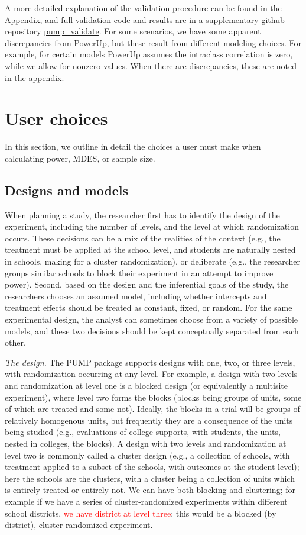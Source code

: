 \documentclass[
]{article}
\begin{document}
A more detailed explanation of the validation procedure can be found in
the Appendix, and full validation code and results are in a
supplementary github repository
\href{https://github.com/MDRCNY/pump_validate}{pump\_validate}. For some
scenarios, we have some apparent discrepancies from PowerUp, but these
result from different modeling choices. For example, for certain models
PowerUp assumes the intraclass correlation is zero, while we allow for
nonzero values. When there are discrepancies, these are noted in the
appendix.

\section{User choices}

In this section, we outline in detail the choices a user must make when
calculating power, MDES, or sample size.

\subsection{Designs and models}
\label{sec:d_m}

When planning a study, the researcher first has to identify the design
of the experiment, including the number of levels, and the level at
which randomization occurs. These decisions can be a mix of the
realities of the context (e.g., the treatment must be applied at the
school level, and students are naturally nested in schools, making for a
cluster randomization), or deliberate (e.g., the researcher groups
similar schools to block their experiment in an attempt to improve
power). Second, based on the design and the inferential goals of the
study, the researchers chooses an assumed model, including whether
intercepts and treatment effects should be treated as constant, fixed,
or random. For the same experimental design, the analyst can sometimes
choose from a variety of possible models, and these two decisions should
be kept conceptually separated from each other.

\emph{The design.} The PUMP package supports designs with one, two, or
three levels, with randomization occurring at any level. For example, a
design with two levels and randomization at level one is a blocked
design (or equivalently a multisite experiment), where level two forms
the blocks (blocks being groups of units, some of which are treated and
some not). Ideally, the blocks in a trial will be groups of relatively
homogenous units, but frequently they are a consequence of the units
being studied (e.g., evaluations of college supports, with students, the
units, nested in colleges, the blocks). A design with two levels and
randomization at level two is commonly called a cluster design (e.g., a
collection of schools, with treatment applied to a subset of the
schools, with outcomes at the student level); here the schools are the
clusters, with a cluster being a collection of units which is entirely
treated or entirely not. We can have both blocking and clustering; for
example if we have a series of cluster-randomized experiments within
different school districts,
\textcolor{red}{we have district at level three}; this would be a
blocked (by district), cluster-randomized experiment.
\end{document}
